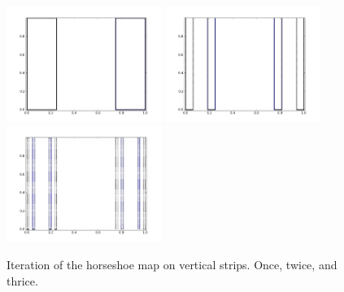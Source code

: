 \documentclass[12pt,twoside]{book}
\begin{document}
\begin{figure}[ht]
  \centering
    \includegraphics[width=0.45\textwidth]{horseshoe_v1}
    \hspace{2mm}
    \includegraphics[width=0.45\textwidth]{horseshoe_v2}
    \vspace{2mm}
    \includegraphics[width=0.45\textwidth]{horseshoe_v3}
  \caption{
    Iteration of the horseshoe map on vertical strips. Once, twice, and thrice.
  }
  \label{fig:horseshoe-vertical}
\end{figure}
\end{document}
